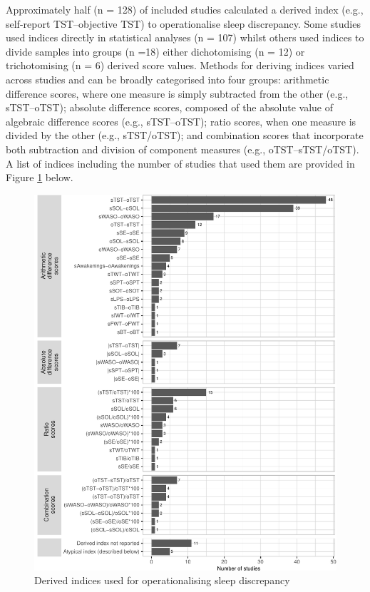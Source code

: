 \documentclass[
]{article}
\begin{document}
Approximately half (n = 128) of included studies calculated a derived index (e.g., self-report TST--objective TST) to operationalise sleep discrepancy. Some studies used indices directly in statistical analyses (n = 107) whilst others used indices to divide samples into groups (n =18) either dichotomising (n = 12) or trichotomising (n = 6) derived score values. Methods for deriving indices varied across studies and can be broadly categorised into four groups: arithmetic difference scores, where one measure is simply subtracted from the other (e.g., sTST--oTST); absolute difference scores, composed of the absolute value of algebraic difference scores (e.g., \textbar sTST--oTST\textbar); ratio scores, when one measure is divided by the other (e.g., sTST/oTST); and combination scores that incorporate both subtraction and division of component measures (e.g., oTST--sTST/oTST). A list of indices including the number of studies that used them are provided in Figure \ref{fig:derived} below.

\begin{figure}
\centering
\includegraphics{review_markdown_files/figure-latex/derived-1.pdf}
\caption{\label{fig:derived}Derived indices used for operationalising sleep discrepancy}
\end{figure}
\end{document}
